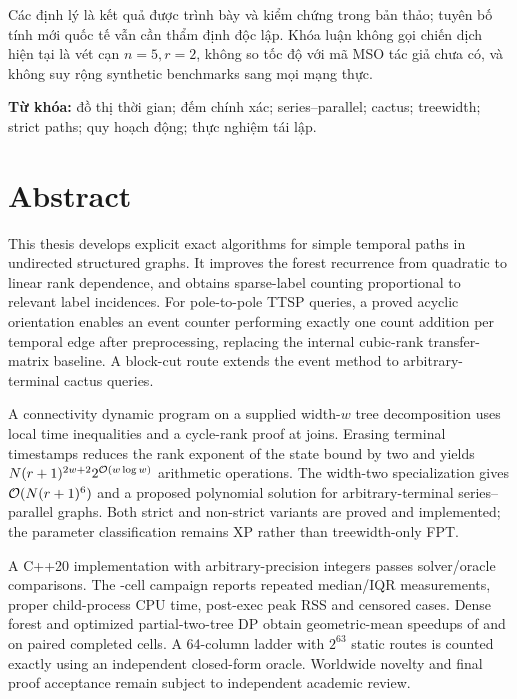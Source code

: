 Các định lý là kết quả được trình bày và kiểm chứng trong bản thảo; tuyên bố tính mới quốc tế vẫn cần thẩm định độc lập. Khóa luận không gọi chiến dịch hiện tại là vét cạn $n=5,r=2$, không so tốc độ với mã MSO tác giả chưa có, và không suy rộng synthetic benchmarks sang mọi mạng thực.

\noindent\textbf{Từ khóa:} đồ thị thời gian; đếm chính xác; series--parallel; cactus; treewidth; strict paths; quy hoạch động; thực nghiệm tái lập.

\chapter*{Abstract}

This thesis develops explicit exact algorithms for simple temporal paths in undirected structured graphs. It improves the forest recurrence from quadratic to linear rank dependence, and obtains sparse-label counting proportional to relevant label incidences. For pole-to-pole TTSP queries, a proved acyclic orientation enables an event counter performing exactly one count addition per temporal edge after preprocessing, replacing the internal cubic-rank transfer-matrix baseline. A block-cut route extends the event method to arbitrary-terminal cactus queries.

A connectivity dynamic program on a supplied width-$w$ tree decomposition uses local time inequalities and a cycle-rank proof at joins. Erasing terminal timestamps reduces the rank exponent of the state bound by two and yields $N(r+1)^{2w+2}2^{\mathcal{O}(w\log w)}$ arithmetic operations. The width-two specialization gives $\mathcal{O}(N(r+1)^6)$ and a proposed polynomial solution for arbitrary-terminal series--parallel graphs. Both strict and non-strict variants are proved and implemented; the parameter classification remains XP rather than treewidth-only FPT.

A C++20 implementation with arbitrary-precision integers passes \AuditComparisons{} solver/oracle comparisons. The \BenchCases{}-cell campaign reports repeated median/IQR measurements, proper child-process CPU time, post-exec peak RSS and censored cases. Dense forest and optimized partial-two-tree DP obtain geometric-mean speedups of \ForestGeoSpeedup{} and \DPGeoSpeedup{} on paired completed cells. A 64-column ladder with $2^{63}$ static routes is counted exactly using an independent closed-form oracle. Worldwide novelty and final proof acceptance remain subject to independent academic review.
